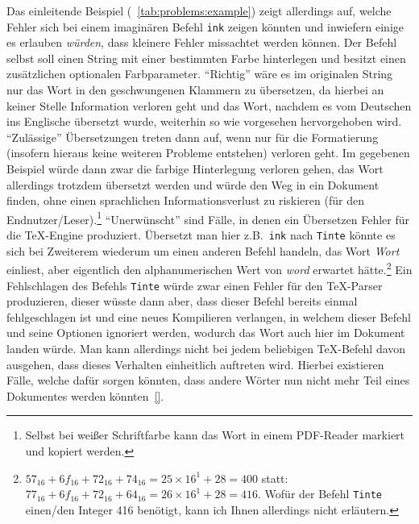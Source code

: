 Das einleitende Beispiel (~\ref{tab:problems:example}) zeigt allerdings auf, welche Fehler sich bei einem imaginären Befehl \texttt{ink} zeigen könnten und inwiefern einige es erlauben \textit{würden}, dass kleinere Fehler missachtet werden können. Der Befehl selbst soll einen String mit einer bestimmten Farbe hinterlegen und besitzt einen zusätzlichen optionalen Farbparameter. 
\enquote{Richtig} wäre es im originalen String nur das Wort in den geschwungenen Klammern zu übersetzen, da hierbei an keiner Stelle Information verloren geht und das Wort, nachdem es vom Deutschen ins Englische übersetzt wurde, weiterhin so wie vorgesehen hervorgehoben wird.
\enquote{Zulässige} Übersetzungen treten dann auf, wenn nur für die Formatierung (insofern hieraus keine weiteren Probleme entstehen) verloren geht. Im gegebenen Beispiel würde dann zwar die farbige Hinterlegung verloren gehen, das Wort allerdings trotzdem übersetzt werden und würde den Weg in ein Dokument finden, ohne einen sprachlichen Informationsverlust zu riskieren (für den Endnutzer/Leser).\footnote{Selbst bei weißer Schriftfarbe kann das Wort in einem PDF-Reader markiert und kopiert werden.}
\enquote{Unerwünscht} sind Fälle, in denen ein Übersetzen Fehler für die \TeX{}-Engine produziert. Übersetzt man hier z.B.\ \texttt{ink} nach \texttt{Tinte} könnte es sich bei Zweiterem wiederum um einen anderen Befehl handeln, das Wort \textit{Wort} einliest, aber eigentlich den alphanumerischen Wert von \textit{word} erwartet hätte.\footnote{$57_{16}+6f_{16} + 72_{16} + 74_{16} = 25\times 16^1 + 28 = 400$ statt:\ $77_{16}+6f_{16} + 72_{16} + 64_{16} = 26\times 16^1 + 28 = 416$. Wofür der Befehl \texttt{Tinte} einen/den Integer 416 benötigt, kann ich Ihnen allerdings nicht erläutern.} Ein Fehlschlagen des Befehls \texttt{Tinte} würde zwar einen Fehler für den \TeX{}-Parser produzieren, dieser wüsste dann aber, dass dieser Befehl bereits einmal fehlgeschlagen ist und eine neues Kompilieren verlangen, in welchem dieser Befehl und seine Optionen ignoriert werden, wodurch das Wort auch hier im Dokument landen würde. Man kann allerdings nicht bei jedem beliebigen \TeX{}-Befehl davon ausgehen, dass dieses Verhalten einheitlich auftreten wird. Hierbei existieren Fälle, welche dafür sorgen könnten, dass andere Wörter nun nicht mehr Teil eines Dokumentes werden könnten~\ref{}.%
